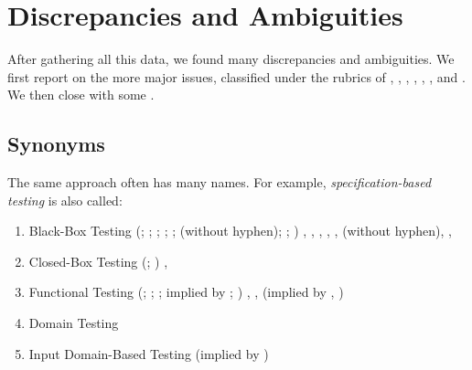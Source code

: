 \section{Discrepancies and Ambiguities}
\label{discrep}

After gathering all this data, we found many discrepancies and
ambiguities. We first report on the more major issues, classified under
the rubrics of , , ,
, \ifnotpaper{}, \fi
{},
and . We then close with some .

\subsection{Synonyms}
\label{syns}
The same approach often has many names. For example,
\emph{specification-based testing} is also called:
\begin{enumerate}
      \item Black-Box Testing
            \ifnotpaper
                  (\citealp[p.~9]{IEEE2022}; \citeyear[p.~8]{IEEE2021};
                  \citeyear[p.~431]{IEEE2017}; \citealp[p.~5-10]{SWEBOK2024};
                  \citealpISTQB{}; \citealp[p.~46]{Firesmith2015} (without hyphen);
                  \citealp[p.~344]{SakamotoEtAl2013}; \citealp[p.~399]{vanVliet2000})
            \else
                  \cite[p.~9]{IEEE2022}, \cite[p.~8]{IEEE2021},
                  \citep[p.~431]{IEEE2017}, \cite[p.~5-10]{SWEBOK2024},
                  \citepISTQB{}, \cite[p.~46]{Firesmith2015} (without hyphen),
                  \cite[p.~344]{SakamotoEtAl2013}, \cite[p.~399]{vanVliet2000}
            \fi
      \item Closed-Box Testing
            \ifnotpaper
                  (\citealp[p.~9]{IEEE2022}; \citeyear[p.~431]{IEEE2017})
            \else
                  \cite[p.~9]{IEEE2022}, \cite[p.~431]{IEEE2017}
            \fi
      \item Functional Testing
            \ifnotpaper
                  (\citeyear[p.~196]{IEEE2017}; \citealp[p.~44]{Kam2008};
                  \citealp[p.~399]{vanVliet2000}; implied by \citeyear[p.~129]{IEEE2021};
                  \citeyear[p.~431]{IEEE2017})
            \else
                  \cite[p.~196]{IEEE2017}, \cite[p.~44]{Kam2008},
                  \cite[p.~399]{vanVliet2000} (implied by \citep[p.~129]{IEEE2021},
                  \cite[p.~431]{IEEE2017})
            \fi
      \item Domain Testing \citep[p.~5-10]{SWEBOK2024}
      \item Input Domain-Based Testing (implied by \citep[p.~4-8]{SWEBOK2014})
\end{enumerate}

